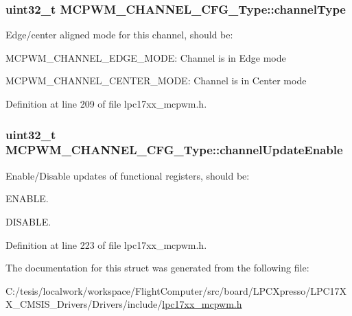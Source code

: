 \hypertarget{struct_m_c_p_w_m___c_h_a_n_n_e_l___c_f_g___type_a2788f235abbe80c743832d577c90b9d9}{
\subsubsection[{channel\-Type}]{\setlength{\rightskip}{0pt plus 5cm}uint32\-\_\-t {\bf \-M\-C\-P\-W\-M\-\_\-\-C\-H\-A\-N\-N\-E\-L\-\_\-\-C\-F\-G\-\_\-\-Type\-::channel\-Type}}}\label{struct_m_c_p_w_m___c_h_a_n_n_e_l___c_f_g___type_a2788f235abbe80c743832d577c90b9d9}
\-Edge/center aligned mode for this channel, should be\-:
\begin{DoxyItemize}
\item \-M\-C\-P\-W\-M\-\_\-\-C\-H\-A\-N\-N\-E\-L\-\_\-\-E\-D\-G\-E\-\_\-\-M\-O\-D\-E\-: \-Channel is in \-Edge mode
\item \-M\-C\-P\-W\-M\-\_\-\-C\-H\-A\-N\-N\-E\-L\-\_\-\-C\-E\-N\-T\-E\-R\-\_\-\-M\-O\-D\-E\-: \-Channel is in \-Center mode 
\end{DoxyItemize}

\-Definition at line 209 of file lpc17xx\-\_\-mcpwm.\-h.

\hypertarget{struct_m_c_p_w_m___c_h_a_n_n_e_l___c_f_g___type_a0fedf51bcb62b0dfac725871afd60809}{
\subsubsection[{channel\-Update\-Enable}]{\setlength{\rightskip}{0pt plus 5cm}uint32\-\_\-t {\bf \-M\-C\-P\-W\-M\-\_\-\-C\-H\-A\-N\-N\-E\-L\-\_\-\-C\-F\-G\-\_\-\-Type\-::channel\-Update\-Enable}}}\label{struct_m_c_p_w_m___c_h_a_n_n_e_l___c_f_g___type_a0fedf51bcb62b0dfac725871afd60809}
\-Enable/\-Disable updates of functional registers, should be\-:
\begin{DoxyItemize}
\item \-E\-N\-A\-B\-L\-E.
\item \-D\-I\-S\-A\-B\-L\-E. 
\end{DoxyItemize}

\-Definition at line 223 of file lpc17xx\-\_\-mcpwm.\-h.



\-The documentation for this struct was generated from the following file\-:\begin{DoxyCompactItemize}
\item 
\-C\-:/tesis/localwork/workspace/\-Flight\-Computer/src/board/\-L\-P\-C\-Xpresso/\-L\-P\-C17\-X\-X\-\_\-\-C\-M\-S\-I\-S\-\_\-\-Drivers/\-Drivers/include/\hyperlink{lpc17xx__mcpwm_8h}{lpc17xx\-\_\-mcpwm.\-h}\end{DoxyCompactItemize}
